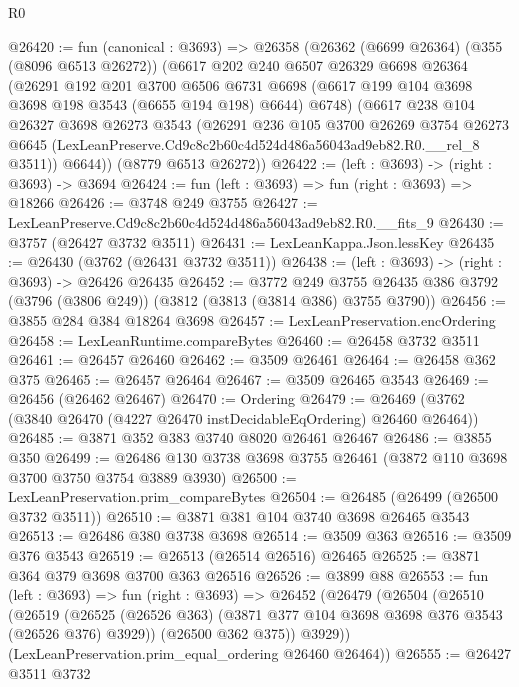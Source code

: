 \begin{lexlean}{R0}
\begin{coremodule}
@26420 := fun (canonical : @3693) =>
  @26358
    (@26362
      (@6699 @26364)
      (@355 (@8096 @6513 @26272))
      (@6617
        @202
        @240
        @6507
        @26329
        @6698
        @26364
        (@26291
          @192
          @201
          @3700
          @6506
          @6731
          @6698
          (@6617 @199 @104 @3698 @3698 @198 @3543 (@6655 @194 @198) @6644)
          @6748)
        (@6617
          @238
          @104
          @26327
          @3698
          @26273
          @3543
          (@26291
            @236
            @105
            @3700
            @26269
            @3754
            @26273
            @6645
            (LexLeanPreserve.Cd9c8c2b60c4d524d486a56043ad9eb82.R0.__rel_8 @3511))
          @6644))
      (@8779 @6513 @26272))
@26422 := (left : @3693) -> (right : @3693) -> @3694
@26424 := fun (left : @3693) => fun (right : @3693) => @18266
@26426 := @3748 @249 @3755
@26427 := LexLeanPreserve.Cd9c8c2b60c4d524d486a56043ad9eb82.R0.__fits_9
@26430 := @3757 (@26427 @3732 @3511)
@26431 := LexLeanKappa.Json.lessKey
@26435 := @26430 (@3762 (@26431 @3732 @3511))
@26438 := (left : @3693) -> (right : @3693) -> @26426 @26435
@26452 := @3772
    @249
    @3755
    @26435
    @386
    @3792
    (@3796 (@3806 @249))
    (@3812 (@3813 (@3814 @386) @3755 @3790))
@26456 := @3855 @284 @384 @18264 @3698
@26457 := LexLeanPreservation.encOrdering
@26458 := LexLeanRuntime.compareBytes
@26460 := @26458 @3732 @3511
@26461 := @26457 @26460
@26462 := @3509 @26461
@26464 := @26458 @362 @375
@26465 := @26457 @26464
@26467 := @3509 @26465 @3543
@26469 := @26456 (@26462 @26467)
@26470 := Ordering
@26479 := @26469 (@3762 (@3840 @26470 (@4227 @26470 instDecidableEqOrdering) @26460 @26464))
@26485 := @3871 @352 @383 @3740 @8020 @26461 @26467
@26486 := @3855 @350
@26499 := @26486 @130 @3738 @3698 @3755 @26461 (@3872 @110 @3698 @3700 @3750 @3754 @3889 @3930)
@26500 := LexLeanPreservation.prim_compareBytes
@26504 := @26485 (@26499 (@26500 @3732 @3511))
@26510 := @3871 @381 @104 @3740 @3698 @26465 @3543
@26513 := @26486 @380 @3738 @3698
@26514 := @3509 @363
@26516 := @3509 @376 @3543
@26519 := @26513 (@26514 @26516) @26465
@26525 := @3871 @364 @379 @3698 @3700 @363 @26516
@26526 := @3899 @88
@26553 := fun (left : @3693) =>
  fun (right : @3693) =>
  @26452
    (@26479
      (@26504
        (@26510
          (@26519
            (@26525 (@26526 @363) (@3871 @377 @104 @3698 @3698 @376 @3543 (@26526 @376) @3929))
            (@26500 @362 @375))
          @3929))
      (LexLeanPreservation.prim_equal_ordering @26460 @26464))
@26555 := @26427 @3511 @3732

\end{coremodule}
\end{lexlean}
